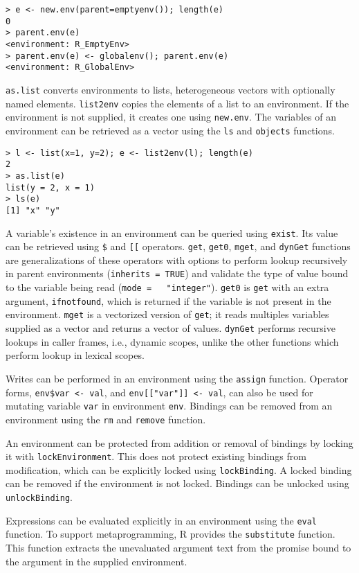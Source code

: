 \documentclass[10pt,review,sigplan,anonymous=true,authorversion=true,nonacm=true]{acmart}
\newcommand{\code}[1]{\lstinline |#1|\xspace}
\newcommand{\newEnv}{\code{new.env}}
\newcommand{\asList}{\code{as.list}}
\newcommand{\listToEnv}{\code{list2env}}
\newcommand{\ls}{\code{ls}}
\newcommand{\objects}{\code{objects}}
\newcommand{\subDollar}{\code{$}}
\newcommand{\subBracket}{\code{[[}}
\newcommand{\exist}{\code{exist}}
\newcommand{\get}{\code{get}}
\newcommand{\getZero}{\code{get0}}
\newcommand{\mget}{\code{mget}}
\newcommand{\dynGet}{\code{dynGet}}
\newcommand{\assign}{\code{assign}}
\newcommand{\remove}{\code{remove}}
\renewcommand{\rm}{\code{rm}}
\newcommand{\lockEnvironment}{\code{lockEnvironment}}
\newcommand{\lockBinding}{\code{lockBinding}}
\newcommand{\unlockBinding}{\code{unlockBinding}}
\newcommand{\eval}{\code{eval}}
\newcommand{\substitute}{\code{substitute}}
\begin{document}
\begin{lstlisting}
> e <- new.env(parent=emptyenv()); length(e)
0
> parent.env(e)
<environment: R_EmptyEnv>
> parent.env(e) <- globalenv(); parent.env(e)
<environment: R_GlobalEnv>
\end{lstlisting}

\asList converts environments to lists, heterogeneous vectors with optionally
named elements. \listToEnv copies the elements of a list to an environment. If
the environment is not supplied, it creates one using \newEnv. The variables of
an environment can be retrieved as a vector using the \ls and \objects
functions.

\begin{lstlisting}
> l <- list(x=1, y=2); e <- list2env(l); length(e)
2
> as.list(e)
list(y = 2, x = 1)
> ls(e)
[1] "x" "y"
\end{lstlisting}

A variable's existence in an environment can be queried using \exist. Its value
can be retrieved using \subDollar and \subBracket operators. \get, \getZero,
\mget, and \dynGet functions are generalizations of these operators with options
to perform lookup recursively in parent environments (\code{inherits = TRUE})
and validate the type of value bound to the variable being read (\code{mode =
  "integer"}). \getZero is \get with an extra argument, \code{ifnotfound}, which
is returned if the variable is not present in the environment. \mget is a
vectorized version of \get; it reads multiples variables supplied as a vector
and returns a vector of values. \dynGet performs recursive lookups in caller
frames, i.e., dynamic scopes, unlike the other functions which perform lookup in
lexical scopes.

Writes can be performed in an environment using the \assign function. Operator
forms, \code{env$var <- val}, and \code{env[["var"]] <- val}, can also be used
for mutating variable \code{var} in environment \code{env}. Bindings
can be removed from an environment using the \rm and \remove function.

An environment can be protected from addition or removal of bindings by locking
it with \lockEnvironment. This does not protect existing bindings from
modification, which can be explicitly locked using \lockBinding. A locked
binding can be removed if the environment is not locked. Bindings can be
unlocked using \unlockBinding.

Expressions can be evaluated explicitly in an environment using the \eval
function. To support metaprogramming, R provides the \substitute function. This
function extracts the unevaluated argument text from the promise bound to the
argument in the supplied environment.
\end{document}
